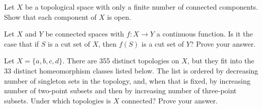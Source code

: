 \item Let $X$ be a topological space with only a finite number of connected components. Show that each component of $X$ is open. 

\begin{comment}

\ExerciseSolution Let $C_1$, $C_2$, $\ldots$, $C_n$ be the distinct components of $X$. We know that each connected component is closed since $\overline{C_i}$ is connected and so $\overline{C_i} \subseteq C_i$. Let $i$ be between $1$ and $n$, and let $K_i = \bigcup_{j \neq i} C_j$. We know that $K_i$ is a closed set. Since $X$ is the disjoint union of the $C_i$, it follows that $C_i = X \setminus K_i$, and so $C_i$ is open. 

\end{comment}


\item Let $X$ and $Y$ be connected spaces with $f : X \to Y$ a continuous function. Is it the case that if $S$ is a cut set of $X$, then $f(S)$ is a cut set of $Y$? Prove your answer.

\begin{comment}

\ExerciseSolution The answer is no. Let $X = [0,1]$ in $\R$ and $Y = \{(x,y) \in \R^2 \mid x^2+y^2 = 1\}$. Define $f: X \to Y$ by $f(t) = (\cos(2 \pi t), \sin(2 \pi t))$. The inverse image of a basic open arc not containing $(1,0)$ in $Y$ is an open interval in $X$, while the inverse image of an open arc that contains $(1,0)$ in $Y$ is a set of the form $[0,s) \cup (t,1]$, which is open in $X$. So $f$ is a continuous function. However, $0.5$ is a cut point of $X$ while $f(0.5)$ is not a cut point of $Y$. 


\end{comment}


\item Let $X = \{a,b,c,d\}$. There are 355 distinct topologies on $X$, but they fit into the 33 distinct homeomorphism classes listed below. The list is ordered by decreasing number of singleton sets in the topology, and, when that is fixed, by increasing number of two-point subsets and then by increasing number of three-point subsets. Under which topologies is $X$ connected? Prove your answer. 

